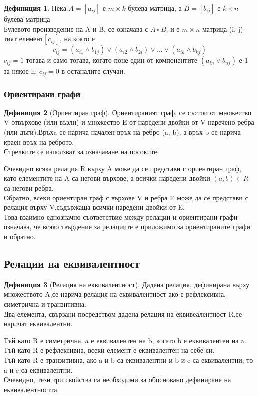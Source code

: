 \documentclass[fleqn, 12pt]{article}
\theoremstyle{definition}
\newtheorem{definition}{Дефиниция}[subsection]
\begin{document}
\begin{definition}
Нека $A = [a_{ij}]$ е $m \times k$ булева матрица, а $B = [b_{ij}]$ е $k \times n$ булева матрица.\\
Булевото произведение на A и B, се означава с $A \circ B$, и е $m\times n$ матрица (i, j)-тият елемент$[c_{ij}]$, на която е 
$$c_{ij}= (a_{i1}\land b_{1j}) \lor (a_{i2}\land b_{2i}) \lor ... \lor (a_{ik} \land b_{kj})$$
$c_{ij} = 1$ тогава и само тогава, когато поне един от компонентите $(a_{in}\lor b_{nj})$ е 1 за някое n; $c_{ij}= 0$ в останалите случаи.
\end{definition}

\subsubsection{Ориентирани графи}

\begin{definition}[Ориентиран граф]
Ориентираният граф, се състои от множество V отвърхове (или възли) и множество E от наредени двойки от V наречено ребра (или дъги).Връхa се нарича начален връх на ребро (a, b), а връх b се нарича краен връх на реброто. \\
Стрелките се използват за означаване на посоките.
\end{definition}
Очевидно всяка релация R върху A може да се представи с ориентиран граф, като елементите на A са негови върхове, а всички наредени двойки $(a, b) \in R$ са негови ребра.\\
Обратно, всеки ориентиран граф с върхове V и ребра E може да се представи с релация върху V,съдържаща всички наредени двойки от E.\\
Това взаимно еднозначно съответствие между релации и ориентирани графи означава, че всяко твърдение за релациите е приложимо за ориентираните графи и обратно.

\subsection{Релации на еквивалентност}

\begin{definition}[Релация на еквивалентност]
Дадена релация, дефинирана върху множеството A,се нарича релация на еквивалентност ако е рефлексивна, симетрична и транзитивна. \\
Два елемента, свързани посредством дадена релация на еквивеалентност R,се наричат еквивалентни.
\end{definition}
Тъй като R е симетрична, a е еквивалентен на b, когато b е еквивалентен на a.\\
Тъй като R е рефлексивна, всеки елемент е еквивалентен на себе си.\\
Тъй като R е транзитивна, ако a и b са еквивалентни и b и c са еквивалентни, то a и c са еквивалентни.\\
Очевидно, тези три свойства са необходими за обосновано дефиниране на еквивалентността.
\end{document}
